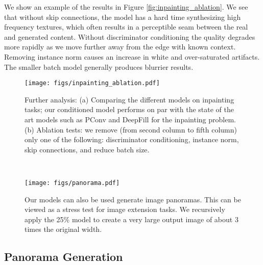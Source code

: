 We show an example of the results in Figure \ref{fig:inpainting_ablation}. We see that without skip connections, the model has a hard time synthesizing high frequency textures, which often results in a perceptible seam between the real and generated content. Without discriminator conditioning the quality degrades more rapidly as we move further away from the edge with known context. Removing instance norm causes an increase in white and over-saturated artifacts. The smaller batch model generally produces blurrier results.

\begin{figure*}
\newcommand{\figurewidth}{\textwidth}
\small
    \centering
    \begin{minipage}{\textwidth}
	    \centering
        \texttt{[image: figs/inpainting\_ablation.pdf]}
        \caption{Further analysis: (a) Comparing the different models on inpainting tasks; our conditioned model performs on par with the state of the art models such as PConv and DeepFill for the inpainting problem. (b) Ablation tests: we remove (from second column to fifth column) only one of the following: discriminator conditioning, instance norm, skip connections, and reduce batch size.}    
        \label{fig:inpainting_ablation}
    \end{minipage}\\[5pt]
 
    \begin{minipage}{\textwidth}
    	\centering
        \texttt{[image: figs/panorama.pdf]}
        \caption{Our models can also be used generate image panoramas. This can be viewed as a stress test for image extension tasks. We recursively apply the 25\% model to create a very large output image of about 3 times the original width.}
        \label{fig:application:panorama}
    \end{minipage}    
\end{figure*}

\subsection{Panorama Generation}
\label{subsec:panorama}

